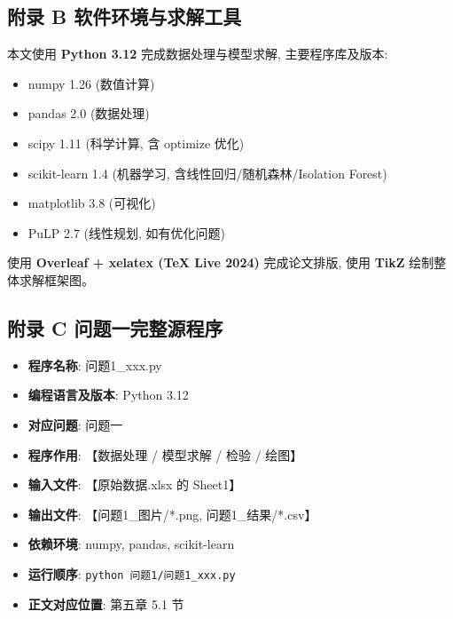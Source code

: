 \subsection*{附录 B \quad 软件环境与求解工具}

本文使用 \textbf{Python 3.12} 完成数据处理与模型求解, 主要程序库及版本:
\begin{itemize}
  \item numpy 1.26 (数值计算)
  \item pandas 2.0 (数据处理)
  \item scipy 1.11 (科学计算, 含 optimize 优化)
  \item scikit-learn 1.4 (机器学习, 含线性回归/随机森林/Isolation Forest)
  \item matplotlib 3.8 (可视化)
  \item PuLP 2.7 (线性规划, 如有优化问题)
\end{itemize}

使用 \textbf{Overleaf + xelatex (TeX Live 2024)} 完成论文排版, 使用 \textbf{TikZ} 绘制整体求解框架图。


\subsection*{附录 C \quad 问题一完整源程序}

\begin{itemize}
  \item \textbf{程序名称}: 问题1\_xxx.py
  \item \textbf{编程语言及版本}: Python 3.12
  \item \textbf{对应问题}: 问题一
  \item \textbf{程序作用}: 【数据处理 / 模型求解 / 检验 / 绘图】
  \item \textbf{输入文件}: 【原始数据.xlsx 的 Sheet1】
  \item \textbf{输出文件}: 【问题1\_图片/*.png, 问题1\_结果/*.csv】
  \item \textbf{依赖环境}: numpy, pandas, scikit-learn
  \item \textbf{运行顺序}: \texttt{python 问题1/问题1\_xxx.py}
  \item \textbf{正文对应位置}: 第五章 5.1 节
\end{itemize}

